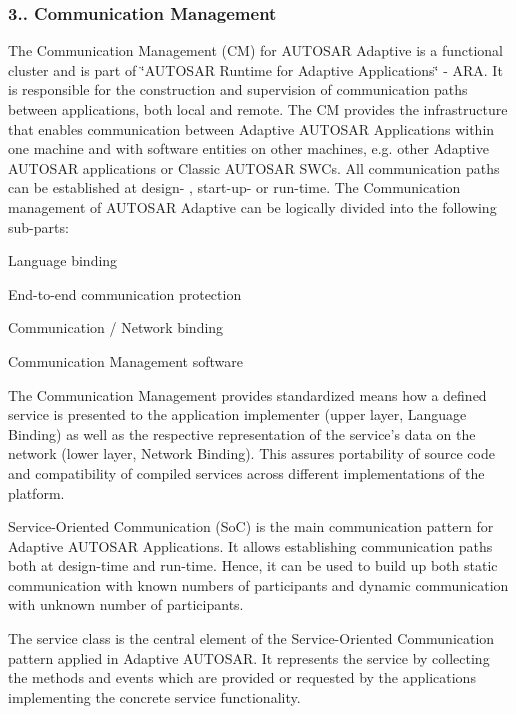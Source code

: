 \subsubsection*{3.. Communication Management}

The Communication Management (CM) for A\+U\+T\+O\+S\+AR Adaptive is a functional cluster and is part of \char`\"{}\+A\+U\+T\+O\+S\+A\+R Runtime for Adaptive Applications\char`\"{} -\/ A\+RA. It is responsible for the construction and supervision of communication paths between applications, both local and remote. The CM provides the infrastructure that enables communication between Adaptive A\+U\+T\+O\+S\+AR Applications within one machine and with software entities on other machines, e.\+g. other Adaptive A\+U\+T\+O\+S\+AR applications or Classic A\+U\+T\+O\+S\+AR S\+W\+Cs. All communication paths can be established at design-\/ , start-\/up-\/ or run-\/time.  The Communication management of A\+U\+T\+O\+S\+AR Adaptive can be logically divided into the following sub-\/parts\+:
\begin{DoxyItemize}
\item Language binding
\item End-\/to-\/end communication protection
\item Communication / Network binding
\item Communication Management software
\end{DoxyItemize}

The Communication Management provides standardized means how a defined service is presented to the application implementer (upper layer, Language Binding) as well as the respective representation of the service’s data on the network (lower layer, Network Binding). This assures portability of source code and compatibility of compiled services across different implementations of the platform.

Service-\/\+Oriented Communication (SoC) is the main communication pattern for Adaptive A\+U\+T\+O\+S\+AR Applications. It allows establishing communication paths both at design-\/time and run-\/time. Hence, it can be used to build up both static communication with known numbers of participants and dynamic communication with unknown number of participants.

The service class is the central element of the Service-\/\+Oriented Communication pattern applied in Adaptive A\+U\+T\+O\+S\+AR. It represents the service by collecting the methods and events which are provided or requested by the applications implementing the concrete service functionality.

